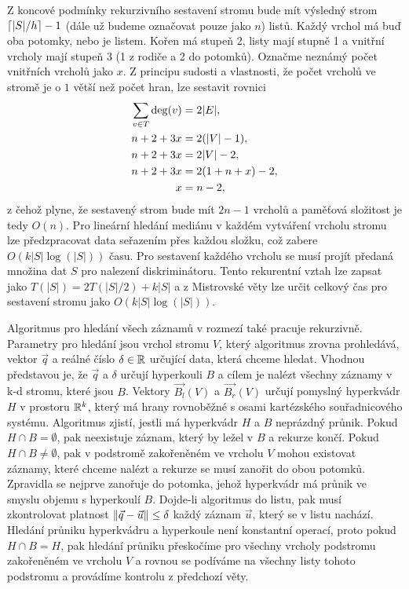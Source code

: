 Z koncové podmínky rekurzivního sestavení stromu bude mít výsledný strom $\lceil|S|/h\rceil- 1$ (dále už budeme označovat pouze jako $n$) listů. Každý vrchol má buď oba potomky, nebo je listem. Kořen má stupeň 2, listy mají stupně 1 a vnitřní vrcholy mají stupeň 3 (1 z rodiče a 2 do potomků). Označme neznámý počet vnitřních vrcholů jako $x$. Z principu sudosti a vlastnosti, že počet vrcholů ve stromě je o $1$ větší než počet hran, lze sestavit rovnici
\begin{align}
  \label{eq:kd-tree-vertex-count}
  \sum_{v \in T}\deg(v) &= 2|E|,\notag\\
            n + 2 + 3x &= 2(|V|-1),\notag\\
            n + 2 + 3x &= 2|V|-2,\notag\\
            n + 2 + 3x &= 2(1+n+x)-2,\notag\\
                     x &= n-2,\notag
\end{align}
z čehož plyne, že sestavený strom bude mít $2n - 1$ vrcholů a paměťová složitost je tedy $O(n)$. Pro lineární hledání mediánu v každém vytváření vrcholu stromu lze předzpracovat data seřazením přes každou složku, což zabere $O(k|S|\log(|S|))$ času. Pro sestavení každého vrcholu se musí projít předaná množina dat $S$ pro nalezení diskriminátoru. Tento rekurentní vztah lze zapsat jako $T(|S|) = 2T(|S|/2) + k|S|$ a z Mistrovské věty lze určit celkový čas pro sestavení stromu jako $O(k|S|\log(|S|))$.

Algoritmus pro hledání všech záznamů v rozmezí také pracuje rekurzivně. Parametry pro hledání jsou vrchol stromu $V$, který algoritmus zrovna prohledává, vektor $\vec{q}$ a reálné číslo $\delta \in \mathbb{R}$ určující data, která chceme hledat. Vhodnou představou je, že $\vec{q}$ a $\delta$ určují hyperkouli $B$ a cílem je nalézt všechny záznamy v k-d stromu, které jsou  $B$. Vektory $\vec{B_l}(V)$ a $\vec{B_r}(V)$ určují pomyslný hyperkvádr $H$ v prostoru $\mathbb{R}^k$, který má hrany rovnoběžné s osami kartézského souřadnicového systému. Algoritmus zjistí, jestli má hyperkvádr $H$ a $B$ neprázdný průnik. Pokud $H \cap B = \emptyset$, pak neexistuje záznam, který by ležel v $B$ a rekurze končí. Pokud $H \cap B \neq \emptyset$, pak v podstromě zakořeněném ve vrcholu $V$ mohou existovat záznamy, které chceme nalézt a rekurze se musí zanořit do obou potomků. Zpravidla se nejprve zanořuje do potomka, jehož hyperkvádr má  průnik ve smyslu objemu s hyperkoulí $B$. Dojde-li algoritmus do listu, pak musí zkontrolovat platnost $\|\vec{q} - \vec{u}\| \leq \delta$ každý záznam $\vec{u}$, který se v listu nachází. Hledání průniku hyperkvádru a hyperkoule není konstantní operací, proto pokud $H \cap B = H$, pak hledání průniku přeskočíme pro všechny vrcholy podstromu zakořeněném ve vrcholu $V$ a rovnou se podíváme na všechny listy tohoto podstromu a provádíme kontrolu z předchozí věty.

